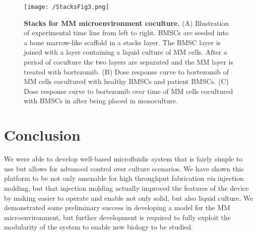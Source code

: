 \begin{figure}[h!] %
\centering
\texttt{[image: /StacksFig3.png]}
\caption[\textbf{Stacks for MM microenvironment coculture}]{\textbf{Stacks for MM microenvironment coculture.} (A) Illustration of experimental time line from left to right. BMSCs are seeded into a bone marrow-like scaffold in a stacks layer. The BMSC layer is joined with a layer containing a liquid culture of MM cells. After a period of coculture the two layers are separated and the MM layer is treated with bortezomib. (B) Dose response curve to bortezomib of MM cells cocultured with healthy BMSCs and patient BMSCs. (C) Dose response curve to bortezomib over time of MM cells cocultured with BMSCs in after being placed in monoculture.}
\label{figure:StacksFig3}
\end{figure}

\section{Conclusion}
We were able to develop well-based microfluidic system that is fairly simple to use but allows for advanced control over culture scenarios. We have shown this platform to be not only amenable for high throughput fabrication \textit{via} injection molding, but that injection molding actually improved the features of the device by making easier to operate and enable not only solid, but also liquid culture. We demonstrated some preliminary success in developing a model for the MM microenvironment, but further development is required to fully exploit the modularity of the system to enable new biology to be studied. 